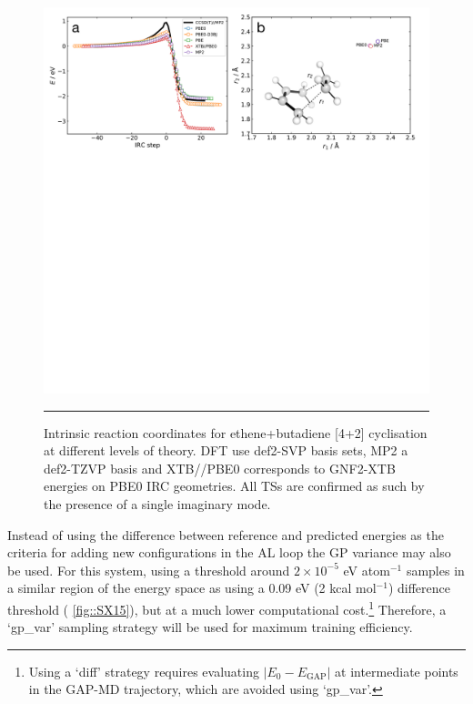 \documentclass[11pt]{article}
\numberwithin{equation}{subsection}
\newcommand{\kcal}{kcal mol$^{-1}$}
\begin{document}
\begin{figure}[h!]
	\centering
	\vspace{0.4cm}
	\includegraphics[width=\textwidth]{figSX12.pdf}
	\vspace{0.0cm}
	\hrule
	\vspace{0.1cm}
	\caption{Intrinsic reaction coordinates for ethene+butadiene [4+2] cyclisation at different levels of theory. DFT use def2-SVP basis sets, MP2 a def2-TZVP basis and XTB//PBE0 corresponds to GNF2-XTB energies on PBE0 IRC geometries. All TSs are confirmed as such by the presence of a single imaginary mode.}
	\label{fig::SX12}
\end{figure}


Instead of using the difference between reference and predicted energies as the criteria for adding new configurations in the AL loop the GP variance may also be used.\cite{gaptrain2021} For this system, using a threshold around $2 \times10^{-5}$ eV atom${}^{-1}$ samples in a similar region of the energy space as using a 0.09 eV (2 \kcal) difference threshold (\figurename{ \ref{fig::SX15}}), but at a much lower computational cost.\footnote{Using a `diff' strategy requires evaluating $|E_0 - E_\text{GAP}|$ at intermediate points in the GAP-MD trajectory, which are avoided using `gp\_var'.} Therefore, a `gp\_var' sampling strategy will be used for maximum training efficiency.
\end{document}
